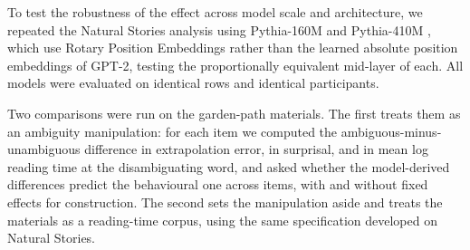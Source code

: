 \documentclass[12pt]{article}
\newcommand{\new}[1]{#1}   %
\begin{document}
\new{To test the robustness of the effect across model scale and architecture, we repeated the Natural Stories analysis using Pythia-160M and Pythia-410M \citep{biderman2023}, which use Rotary Position Embeddings rather than the learned absolute position embeddings of GPT-2, testing the proportionally equivalent mid-layer of each. All models were evaluated on identical rows and identical participants.}

\new{Two comparisons were run on the garden-path materials. The first treats them as an ambiguity manipulation: for each item we computed the ambiguous-minus-unambiguous difference in extrapolation error, in surprisal, and in mean log reading time at the disambiguating word, and asked whether the model-derived differences predict the behavioural one across items, with and without fixed effects for construction. The second sets the manipulation aside and treats the materials as a reading-time corpus, using the same specification developed on Natural Stories.}
\end{document}
